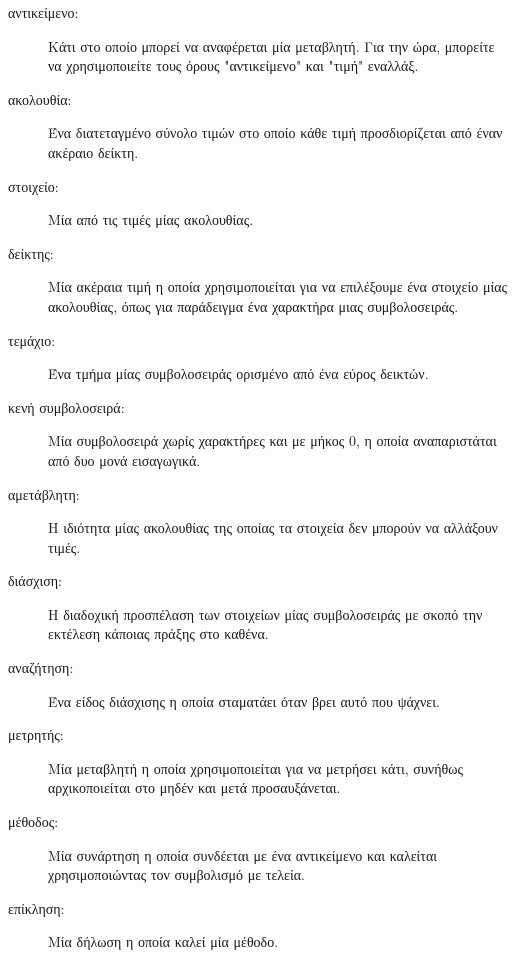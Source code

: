 \documentclass[10pt]{book}
\begin{document}
\begin{description}

\item[αντικείμενο:] Κάτι στο οποίο μπορεί να αναφέρεται μία μεταβλητή. Για την ώρα, μπορείτε να χρησιμοποιείτε τους όρους "αντικείμενο" και "τιμή" εναλλάξ.

\item[ακολουθία:] Ένα διατεταγμένο σύνολο τιμών στο οποίο κάθε τιμή προσδιορίζεται από έναν ακέραιο δείκτη.

\item[στοιχείο:] Μία από τις τιμές μίας ακολουθίας.

\item[δείκτης:] Μία ακέραια τιμή η οποία χρησιμοποιείται για να επιλέξουμε ένα στοιχείο μίας ακολουθίας, όπως για παράδειγμα ένα χαρακτήρα μιας συμβολοσειράς.

\item[τεμάχιο:] Ένα τμήμα μίας συμβολοσειράς ορισμένο από ένα εύρος δεικτών.

\item[κενή συμβολοσειρά:] Μία συμβολοσειρά χωρίς χαρακτήρες και με μήκος 0, η οποία αναπαριστάται από δυο μονά εισαγωγικά.

\item[αμετάβλητη:] Η ιδιότητα μίας ακολουθίας της οποίας τα στοιχεία δεν μπορούν να αλλάξουν τιμές.

\item[διάσχιση:] Η διαδοχική προσπέλαση των στοιχείων μίας συμβολοσειράς με σκοπό την εκτέλεση κάποιας πράξης στο καθένα.

\item[αναζήτηση:] Ένα είδος διάσχισης η οποία σταματάει όταν βρει αυτό που ψάχνει.

\item[μετρητής:] Μία μεταβλητή η οποία χρησιμοποιείται για να μετρήσει κάτι, συνήθως αρχικοποιείται στο μηδέν και μετά προσαυξάνεται.

\item[μέθοδος:] Μία συνάρτηση η οποία συνδέεται με ένα αντικείμενο και καλείται χρησιμοποιώντας τον συμβολισμό με τελεία.

\item[επίκληση:] Μία δήλωση η οποία καλεί μία μέθοδο.

\end{description}
\end{document}
